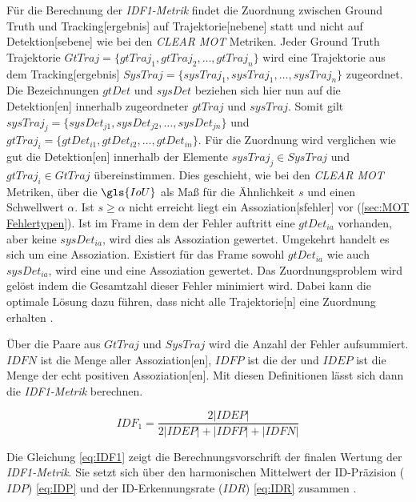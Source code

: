 Für die Berechnung der \textit{\gls{IDF1}-Metrik} findet die Zuordnung zwischen \gls{Ground Truth} und \gls{Tracking}[ergebnis] auf \gls{Trajektorie}[nebene] statt und nicht auf \gls{Detektion}[sebene] wie bei den \textit{\acrshort{CLEAR} \gls{MOT}} Metriken. Jeder \gls{Ground Truth} \gls{Trajektorie} \(GtTraj = \{gtTraj_1, gtTraj_2, \dots, gtTraj_n\}\) wird eine \gls{Trajektorie} aus dem \gls{Tracking}[ergebnis] \(SysTraj = \{sysTraj_1, sysTraj_1, \dots, sysTraj_n\}\) zugeordnet. Die Bezeichnungen \(gtDet\) und \(sysDet\) beziehen sich hier nun auf die \gls{Detektion}[en] innerhalb zugeordneter \(gtTraj\) und \(sysTraj\). Somit gilt \(sysTraj_j = \{sysDet_{j1}, sysDet_{j2}, \dots, sysDet_{jn}\}\) und \(gtTraj_i = \{gtDet_{i1}, gtDet_{i2}, \dots, gtDet_{in}\}\). Für die Zuordnung wird verglichen wie gut die \gls{Detektion}[en] innerhalb der Elemente \(sysTraj_j \in SysTraj\) und \(gtTraj_i \in GtTraj\) übereinstimmen. Dies geschieht, wie bei den \textit{\acrshort{CLEAR} \gls{MOT}} Metriken, über die \(\gls{IoU}\) als Maß für die Ähnlichkeit \(s\) und einen Schwellwert \(\alpha\). Ist \(s \geq \alpha\) nicht erreicht liegt ein \gls{Assoziation}[sfehler] vor (\ref{sec:MOT Fehlertypen}). Ist im \gls{Frame} in dem der Fehler auftritt eine \(gtDet_{ia}\) vorhanden, aber keine \(sysDet_{ia}\), wird dies als  \gls{Assoziation} gewertet. Umgekehrt handelt es sich um eine  \gls{Assoziation}. Existiert für das \gls{Frame} sowohl \(gtDet_{ia}\) wie auch \(sysDet_{ia}\), wird eine  und eine  \gls{Assoziation} gewertet. Das Zuordnungsproblem wird gelöst indem die Gesamtzahl dieser Fehler minimiert wird. Dabei kann die optimale Lösung dazu führen, dass nicht alle \gls{Trajektorie}[n] eine Zuordnung erhalten \cite{IDF1}. \par

Über die Paare aus \(GtTraj\) und \(SysTraj\) wird die Anzahl der Fehler aufsummiert. \(IDFN\) ist die Menge aller  \gls{Assoziation}[en], \(IDFP\) ist die der  und \(IDEP\) ist die Menge der echt positiven \gls{Assoziation}[en]. Mit diesen Definitionen lässt sich dann die \textit{\gls{IDF1}-Metrik} berechnen. 

\begin{equation}
    \label{eq:IDF1}
    IDF_1 = \frac{2 |IDEP|}{2 |IDEP|+|IDFP|+|IDFN|}
\end{equation}

Die Gleichung \ref{eq:IDF1} zeigt die Berechnungsvorschrift der finalen Wertung der \textit{\gls{IDF1}-Metrik}. Sie setzt sich über den harmonischen Mittelwert der ID-Präzision (\(IDP\)) \ref{eq:IDP} und der ID-Erkennungsrate (\(IDR\)) \ref{eq:IDR} zusammen \cite{IDF1, Kroschel.2011}.

